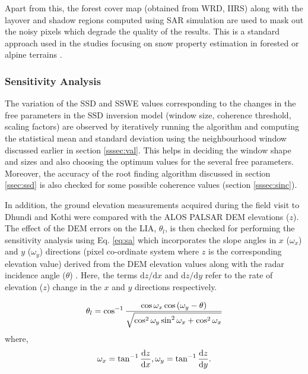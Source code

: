 \documentclass[12pt]{elsarticle}
\numberwithin{equation}{section}
\numberwithin{figure}{section}
\numberwithin{table}{section}
\begin{document}
Apart from this, the forest cover map (obtained from WRD, IIRS) along with the layover and shadow regions computed using SAR simulation are used to mask out the noisy pixels which degrade the quality of the results. This is a standard approach used in the studies focusing on snow property estimation in forested or alpine terrains \citep{Leinss2014, Leinss2016, Singh2017, Thakur2012, Usami2016}.

\subsubsection{Sensitivity Analysis}
\label{sssec:sa}

The variation of the SSD and SSWE values corresponding to the changes in the free parameters in the SSD inversion model (window size, coherence threshold, scaling factors) are observed by iteratively running the algorithm and computing the statistical mean and standard deviation using the neighbourhood window discussed earlier in section \ref{sssec:val}. This helps in deciding the window shape and sizes and also choosing the optimum values for the several free parameters. Moreover, the accuracy of the root finding algorithm discussed in section \ref{ssec:ssd} is also checked for some possible coherence values (section \ref{sssec:sinc}).

In addition, the ground elevation measurements acquired during the field visit to Dhundi and Kothi were compared with the ALOS PALSAR DEM elevations ($z$). The effect of the DEM errors on the LIA, $\theta_l$, is then checked for performing the sensitivity analysis using Eq. \eqref{eq:sa} which incorporates the slope angles in $x$ ($\omega_x$) and $y$ ($\omega_y$) directions (pixel co-ordinate system where $z$ is the corresponding elevation value) derived from the DEM elevation values along with the radar incidence angle ($\theta$) \citep{Lee2000, Lee2009}. Here, the terms $\mathrm{d}z/\mathrm{d}x$ and $\mathrm{d}z/\mathrm{d}y$ refer to the rate of elevation ($z$) change in the $x$ and $y$ directions respectively.

\begin{equation}
    \centering
    \label{eq:sa}
    \theta_l = \cos^{-1}\frac{\cos\omega_x\cos\left(\omega_y - \theta\right)}{\sqrt{\cos^2\omega_y\sin^2\omega_x + \cos^2\omega_x}}
\end{equation}
where, 
\begin{equation*}
    \centering
    \omega_x = \tan^{-1}\frac{\mathrm{d}z}{\mathrm{d}x}, \omega_y = \tan^{-1}\frac{\mathrm{d}z}{\mathrm{d}y}.
\end{equation*}
\end{document}

